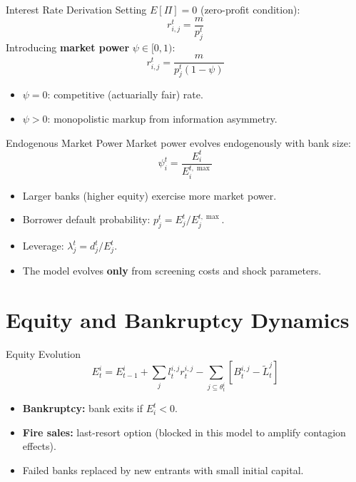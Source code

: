 \begin{frame}{Interest Rate Derivation}
  Setting $E[\Pi] = 0$ (zero-profit condition):
  \[
    r_{i,j}^t = \frac{m}{p_j^t}
  \]
  Introducing \textbf{market power} $\psi \in [0,1)$:
  \[
    \boxed{r_{i,j}^t = \frac{m}{p_j^t (1 - \psi)}}
  \]
  \begin{itemize}
    \item $\psi = 0$: competitive (actuarially fair) rate.
    \item $\psi > 0$: monopolistic markup from information asymmetry.
  \end{itemize}
\end{frame}

\begin{frame}{Endogenous Market Power}
  Market power evolves endogenously with bank size:
  \[
    \psi_i^t = \frac{E_i^t}{E_i^{t,\max}}
  \]
  \begin{itemize}
    \item Larger banks (higher equity) exercise more market power.
    \item Borrower default probability:
    $p_j^t = E_j^t / E_j^{t,\max}$.
    \item Leverage: $\lambda_j^t = d_j^t / E_j^t$.
    \item The model evolves \textbf{only} from screening costs and shock parameters.
  \end{itemize}
\end{frame}

\section{Equity and Bankruptcy Dynamics}\label{sec:5}

\begin{frame}{Equity Evolution}
  \[
    E_t^i = E_{t-1}^i + \sum_{j} l_{t}^{i,j} r_{t}^{i,j} - \sum_{j \subseteq \theta_t^i} \left[ B_t^{i,j} - \tilde{L}_t^j \right]
  \]
  \begin{itemize}
    \item \textbf{Bankruptcy:} bank exits if $E_i^t < 0$.
    \item \textbf{Fire sales:} last-resort option (blocked in this model to amplify contagion effects).
    \item Failed banks replaced by new entrants with small initial capital.
  \end{itemize}
\end{frame}

